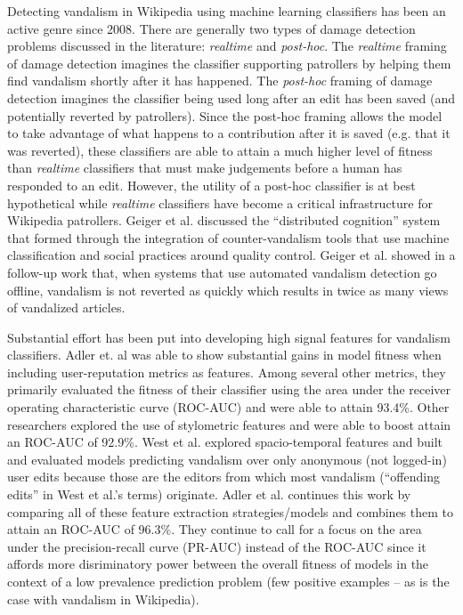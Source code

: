 \documentclass{sig-alternate}
\begin{document}
Detecting vandalism in Wikipedia using machine learning classifiers has been an active genre since 2008\cite{smets:automatic}. There are generally two types of damage detection problems discussed in the literature: \textit{realtime} and \textit{post-hoc}.  The \textit{realtime} framing of damage detection imagines the classifier supporting patrollers by helping them find vandalism shortly after it has happened.  The \textit{post-hoc} framing of damage detection imagines the classifier being used long after an edit has been saved (and potentially reverted by patrollers).  Since the post-hoc framing allows the model to take advantage of what happens to a contribution after it is saved (e.g. that it was reverted), these classifiers are able to attain a much higher level of fitness than \textit{realtime} classifiers that must make judgements before a human has responded to an edit.  However, the utility of a post-hoc classifier is at best hypothetical while \textit{realtime} classifiers have become a critical infrastructure for Wikipedia patrollers\cite{geiger:work, geiger:levee}.  Geiger et al. discussed the ``distributed cognition'' system that formed through the integration of counter-vandalism tools that use machine classification and social practices around quality control\cite{geiger:work}.  Geiger et al. showed in a follow-up work that, when systems that use automated vandalism detection go offline, vandalism is not reverted as quickly which results in twice as many views of vandalized articles\cite{geiger:levee}.

Substantial effort has been put into developing high signal features for vandalism classifiers.  Adler et. al was able to show substantial gains in model fitness when including user-reputation metrics as features\cite{adler:detecting}. Among several other metrics, they primarily evaluated the fitness of their classifier using the area under the receiver operating characteristic curve (ROC-AUC) and were able to attain 93.4\%. Other researchers explored the use of stylometric features and were able to boost attain an ROC-AUC of 92.9\%\cite{wang:got,harpalani:language}.  West et al. explored spacio-temporal features and built and evaluated models predicting vandalism over only anonymous (not logged-in) user edits because those are the editors from which most vandalism (``offending edits'' in West et al.'s terms) originate\cite{west:detecting}.  Adler et al. continues this work by comparing all of these feature extraction strategies/models and combines them to attain an ROC-AUC of 96.3\%\cite{adler:wikipedia}.  They continue to call for a focus on the area under the precision-recall curve (PR-AUC) instead of the ROC-AUC since it affords more disriminatory power between the overall fitness of models in the context of a low prevalence prediction problem (few positive examples -- as is the case with vandalism in Wikipedia).
\end{document}
